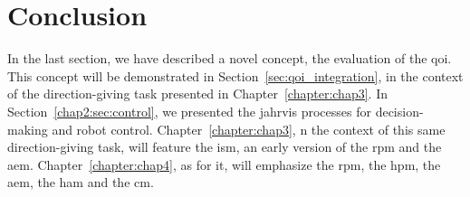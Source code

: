 \documentclass[a4paper,11pt,twoside]{StyleThese}
\begin{document}
\section{Conclusion}
In the last section, we have described a novel concept, the evaluation of the \acrfull{qoi}. This concept will be demonstrated in Section~\ref{sec:qoi_integration}, in the context of the direction-giving task presented in Chapter~\ref{chapter:chap3}. In Section~\ref{chap2:sec:control}, we presented the \acrshort{jahrvis} processes for decision-making and robot control. Chapter~\ref{chapter:chap3}, n the context of this same direction-giving task, will feature the \acrlong{ism}, an early version of the \acrlong{rpm} and the \acrlong{aem}. Chapter~\ref{chapter:chap4}, as for it, will emphasize the \acrlong{rpm}, the \acrlong{hpm}, the \acrlong{aem}, the \acrlong{ham} and the \acrlong{cm}.

\ifdefined{}
\else


\end{document}
